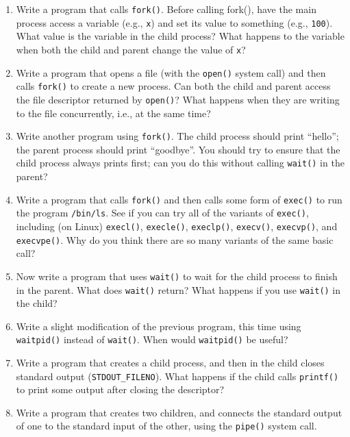 \documentclass[12pt]{article}
\begin{document}
\begin{enumerate}[1.]
    \item Write a program that calls \texttt{fork()}. Before calling fork(), have the
    main process access a variable (e.g., \texttt{x}) and set its value to something (e.g., \texttt{100}).
    What value is the variable in the child process?
    What happens to the variable when both the child and parent change
    the value of \texttt{x}?

    \item Write a program that opens a file (with the \texttt{open()} system call)
    and then calls \texttt{fork()} to create a new process. Can both the child
    and parent access the file descriptor returned by \texttt{open()}? What
    happens when they are writing to the file concurrently, i.e., at the
    same time?

    \item Write another program using \texttt{fork()}. The child process should
    print “hello”; the parent process should print “goodbye”. You should
    try to ensure that the child process always prints first; can you do
    this without calling \texttt{wait()} in the parent?

    \item Write a program that calls \texttt{fork()} and then calls some form of
    \texttt{exec()} to run the program \texttt{/bin/ls}. See if you can try all of the
    variants of \texttt{exec()}, including (on Linux) \texttt{execl()}, \texttt{execle()},
    \texttt{execlp()}, \texttt{execv()}, \texttt{execvp()}, and \texttt{execvpe()}. Why do
    you think there are so many variants of the same basic call?

    \item Now write a program that uses \texttt{wait()} to wait for the child process
    to finish in the parent. What does \texttt{wait()} return? What happens if
    you use \texttt{wait()} in the child?

    \item Write a slight modification of the previous program, this time using
    \texttt{waitpid()} instead of \texttt{wait()}. When would \texttt{waitpid()}
    be useful?

    \item Write a program that creates a child process, and then in the child
    closes standard output (\texttt{STDOUT\_FILENO}). What happens if the child
    calls \texttt{printf()} to print some output after closing the descriptor?

    \item Write a program that creates two children, and connects the standard output of one to the standard input of the other, using the
    \texttt{pipe()} system call.
\end{enumerate}
\end{document}
